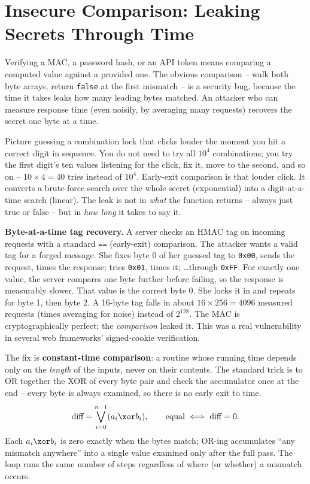 \section{Insecure Comparison: Leaking Secrets Through Time}
\label{ch38:timing}

Verifying a MAC, a password hash, or an API token means comparing a computed value against a provided one. The obvious comparison -- walk both byte arrays, return \texttt{false} at the first mismatch -- is a security bug, because the time it takes leaks how many leading bytes matched. An attacker who can measure response time (even noisily, by averaging many requests) recovers the secret one byte at a time.

\begin{intuitionbox}
Picture guessing a combination lock that clicks louder the moment you hit a correct digit in sequence. You do not need to try all $10^4$ combinations; you try the first digit's ten values listening for the click, fix it, move to the second, and so on -- $10 \times 4 = 40$ tries instead of $10^4$. Early-exit comparison is that louder click. It converts a brute-force search over the whole secret (exponential) into a digit-at-a-time search (linear). The leak is not in \emph{what} the function returns -- always just true or false -- but in \emph{how long} it takes to say it.
\end{intuitionbox}

\begin{attackbox}
\textbf{Byte-at-a-time tag recovery.} A server checks an HMAC tag on incoming requests with a standard \texttt{==} (early-exit) comparison. The attacker wants a valid tag for a forged message. She fixes byte 0 of her guessed tag to \texttt{0x00}, sends the request, times the response; tries \texttt{0x01}, times it; \dots through \texttt{0xFF}. For exactly one value, the server compares one byte further before failing, so the response is measurably slower. That value is the correct byte 0. She locks it in and repeats for byte 1, then byte 2. A 16-byte tag falls in about $16 \times 256 = 4096$ measured requests (times averaging for noise) instead of $2^{128}$. The MAC is cryptographically perfect; the \emph{comparison} leaked it. This was a real vulnerability in several web frameworks' signed-cookie verification.
\end{attackbox}

\begin{whybox}
The fix is \textbf{constant-time comparison}: a routine whose running time depends only on the \emph{length} of the inputs, never on their contents. The standard trick is to OR together the XOR of every byte pair and check the accumulator once at the end -- every byte is always examined, so there is no early exit to time.
\[
\text{diff} = \bigvee_{i=0}^{n-1} (a_i \xor b_i), \qquad \text{equal} \iff \text{diff} = 0.
\]
Each $a_i \xor b_i$ is zero exactly when the bytes match; OR-ing accumulates ``any mismatch anywhere'' into a single value examined only after the full pass. The loop runs the same number of steps regardless of where (or whether) a mismatch occurs.
\end{whybox}

